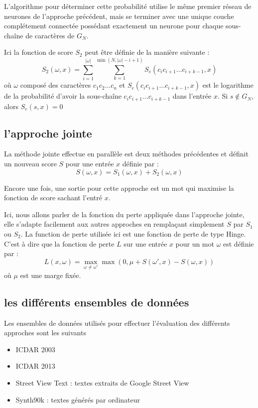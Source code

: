 \documentclass{article}
\begin{document}
L'algorithme pour déterminer cette probabilité utilise le même premier réseau de neurones de l'approche précédent, mais se terminer avec une unique couche complétement connectée possédant exactement un neurone pour chaque sous-chaîne de caractères de $G_N$. 

Ici la fonction de score $S_2$ peut être définie de la manière suivante :
$$S_2(\omega,x) = \sum_{i=1}^{|\omega|} \sum_{k=1}^{\min(N,|\omega| -i +1)} S_e(c_ic_{i+1}\dots c_{i+k-1},x)$$
où $\omega$ composé des caractères $c_1c_2\dots c_n$ et $S_e(c_ic_{i+1}\dots c_{i+k-1},x)$ est le logarithme de la probabilité d'avoir la sous-chaîne $c_ic_{i+1}\dots c_{i+k-1}$ dans l'entrée $x$. Si $s \notin G_N$, alors $S_e(s,x) = 0$

\subsection{l'approche jointe}
La méthode jointe effectue en parallèle est deux méthodes précédentes et définit un nouveau score $S$ pour une entrée $x$ définie par :
$$ S(\omega,x) = S_1(\omega,x) + S_2(\omega,x)$$

Encore une fois, une sortie pour cette approche est un mot qui maximise la fonction de score sachant l'entré $x$.

Ici, nous allons parler de la fonction du perte appliquée dans l'approche jointe, elle s'adapte facilement aux autres approches en remplaçant simplement $S$ par $S_1$ ou $S_2$. La function de perte utilisée ici est une fonction de perte de type Hinge. C'est à dire que la fonction de perte $L$ sur une entrée $x$ pour un mot $\omega$ est définie par :
$$ L(x,\omega) = \max_{\omega \neq \omega' } \max(0,\mu+ S(\omega',x) - S(\omega,x))$$
où $\mu$ est une marge fixée.

\subsection{les différents ensembles de données}

Les ensembles de données utilisés pour effectuer l'évaluation des différents approches sont les suivants
\begin{itemize}
\item ICDAR 2003
\item ICDAR 2013
\item Street View Text : textes extraits de Google Street View
\item Synth90k : textes générés par ordinateur
\end{itemize}
\end{document}
